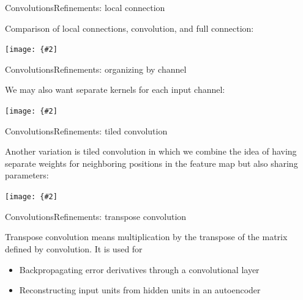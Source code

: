 \documentclass[aspectratio=169]{beamer}
\newcommand{\myfig}[3]{\centerline{\texttt{[image: \{\#2]}}}
\begin{document}
\begin{frame}{Convolutions}{Refinements: local connection}

Comparison of local connections, convolution, and full connection:

\myfig{1.8in}{goodfellow-fig9-14}{Goodfellow et al. (2016), Figure 9.14}

\end{frame}


\begin{frame}{Convolutions}{Refinements: organizing by channel}

We may also want separate kernels for each input channel:

\myfig{1.6in}{goodfellow-fig9-15}{Goodfellow et al. (2016), Figure 9.15}

\end{frame}


\begin{frame}{Convolutions}{Refinements: tiled convolution}

Another variation is \alert{tiled convolution} in which we combine
the idea of having separate weights for neighboring positions in the
feature map but also sharing parameters:

\myfig{1.6in}{goodfellow-fig9-16}{Goodfellow et al. (2016), Figure 9.16}

\end{frame}


\begin{frame}{Convolutions}{Refinements: transpose convolution}

\alert{Transpose convolution} means multiplication by the transpose of the
matrix defined by convolution. It is used for
\begin{itemize}
\item Backpropagating error derivatives through a convolutional layer
\item Reconstructing input units from hidden units in an autoencoder
\end{itemize}

\end{frame}
\end{document}
